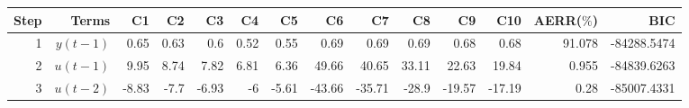 \begin{tabular}{rrrrrrrrrrrrrr}
Step & Terms & C1 & C2 & C3 & C4 & C5 & C6 & C7 & C8 & C9 & C10 & AERR($\%$) & BIC \\ 
\hline 
1 & $y(t-1)$ & 0.65 & 0.63 & 0.6 & 0.52 & 0.55 & 0.69 & 0.69 & 0.69 & 0.68 & 0.68 & 91.078 & -84288.5474 \\ 
2 & $u(t-1)$ & 9.95 & 8.74 & 7.82 & 6.81 & 6.36 & 49.66 & 40.65 & 33.11 & 22.63 & 19.84 & 0.955 & -84839.6263 \\ 
3 & $u(t-2)$ & -8.83 & -7.7 & -6.93 & -6 & -5.61 & -43.66 & -35.71 & -28.9 & -19.57 & -17.19 & 0.28 & -85007.4331 \\ 
\hline 
\end{tabular}